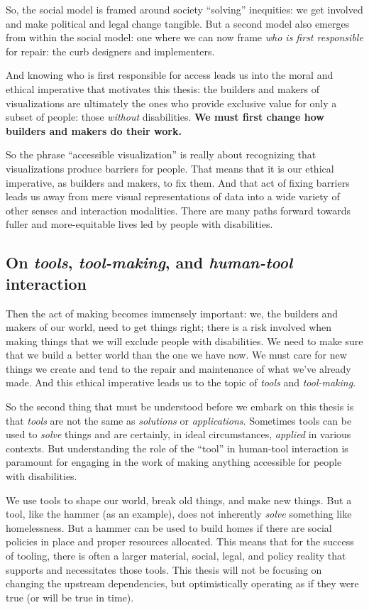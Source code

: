 \documentclass[12pt]{cmuthesis}
\begin{document}
So, the social model is framed around society ``solving'' inequities: we get involved and make political and legal change tangible. But a second model also emerges from within the social model: one where we can now frame \textit{who is first responsible} for repair: the curb designers and implementers.

And knowing who is first responsible for access leads us into the moral and ethical imperative that motivates this thesis: the builders and makers of visualizations are ultimately the ones who provide exclusive value for only a subset of people: those \textit{without} disabilities. \textbf{We must first change how builders and makers do their work.}

So the phrase ``accessible visualization'' is really about recognizing that visualizations produce barriers for people. That means that it is our ethical imperative, as builders and makers, to fix them. And that act of fixing barriers leads us away from mere visual representations of data into a wide variety of other senses and interaction modalities. There are many paths forward towards fuller and more-equitable lives led by people with disabilities.

\subsection{On \textit{tools}, \textit{tool-making}, and \textit{human-tool} interaction}
Then the act of making becomes immensely important: we, the builders and makers of our world, need to get things right; there is a risk involved when making things that we will exclude people with disabilities. We need to make sure that we build a better world than the one we have now. We must care for new things we create and tend to the repair and maintenance of what we've already made. And this ethical imperative leads us to the topic of \textit{tools} and \textit{tool-making}.

So the second thing that must be understood before we embark on this thesis is that \textit{tools} are not the same as \textit{solutions} or \textit{applications}. Sometimes tools can be used to \textit{solve} things and are certainly, in ideal circumstances, \textit{applied} in various contexts. But understanding the role of the ``tool'' in human-tool interaction is paramount for engaging in the work of making anything accessible for people with disabilities.

We use tools to shape our world, break old things, and make new things. But a tool, like the hammer (as an example), does not inherently \textit{solve} something like homelessness. But a hammer can be used to build homes if there are social policies in place and proper resources allocated. This means that for the success of tooling, there is often a larger material, social, legal, and policy reality that supports and necessitates those tools. This thesis will not be focusing on changing the upstream dependencies, but optimistically operating as if they were true (or will be true in time).
\end{document}

